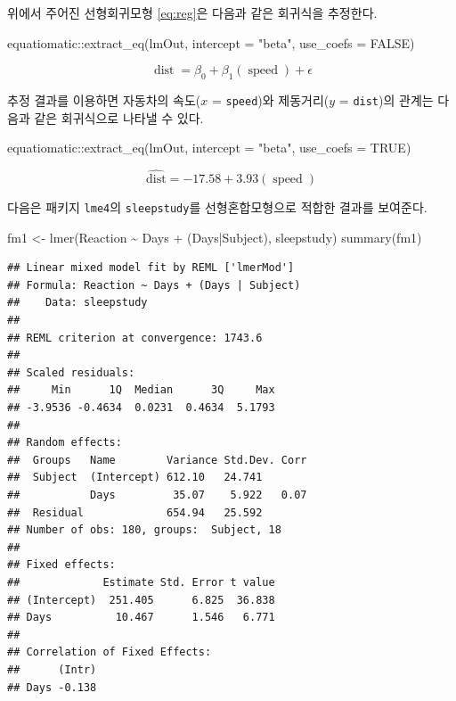 \documentclass[
]{book}
\newenvironment{Shaded}{\begin{snugshade}}{\end{snugshade}}
\newcommand{\AttributeTok}[1]{\textcolor[rgb]{0.77,0.63,0.00}{#1}}
\newcommand{\ConstantTok}[1]{\textcolor[rgb]{0.00,0.00,0.00}{#1}}
\newcommand{\FunctionTok}[1]{\textcolor[rgb]{0.00,0.00,0.00}{#1}}
\newcommand{\NormalTok}[1]{#1}
\newcommand{\OtherTok}[1]{\textcolor[rgb]{0.56,0.35,0.01}{#1}}
\newcommand{\SpecialCharTok}[1]{\textcolor[rgb]{0.00,0.00,0.00}{#1}}
\newcommand{\StringTok}[1]{\textcolor[rgb]{0.31,0.60,0.02}{#1}}
\theoremstyle{definition}
\theoremstyle{definition}
\theoremstyle{definition}
\theoremstyle{definition}
\theoremstyle{remark}
\begin{document}
위에서 주어진 선형회귀모형 \eqref{eq:reg}은 다음과 같은 회귀식을 추정한다.

\begin{Shaded}
\begin{Highlighting}[]
\NormalTok{equatiomatic}\SpecialCharTok{::}\FunctionTok{extract\_eq}\NormalTok{(lmOut, }\AttributeTok{intercept =} \StringTok{"beta"}\NormalTok{,  }\AttributeTok{use\_coefs =} \ConstantTok{FALSE}\NormalTok{)}
\end{Highlighting}
\end{Shaded}

\[
\operatorname{dist} = \beta_{0} + \beta_{1}(\operatorname{speed}) + \epsilon
\]

추정 결과를 이용하면 자동차의 속도(\(x\) = \texttt{speed})와 제동거리(\(y\) = \texttt{dist})의 관계는 다음과 같은 회귀식으로 나타낼 수 있다.

\begin{Shaded}
\begin{Highlighting}[]
\NormalTok{equatiomatic}\SpecialCharTok{::}\FunctionTok{extract\_eq}\NormalTok{(lmOut, }\AttributeTok{intercept =} \StringTok{"beta"}\NormalTok{, }\AttributeTok{use\_coefs =} \ConstantTok{TRUE}\NormalTok{)}
\end{Highlighting}
\end{Shaded}

\[
\operatorname{\widehat{dist}} = -17.58 + 3.93(\operatorname{speed})
\]

다음은 패키지 \texttt{lme4}의 \texttt{sleepstudy}를 선형혼합모형으로 적합한 결과를 보여준다.

\begin{Shaded}
\begin{Highlighting}[]
\NormalTok{fm1 }\OtherTok{\textless{}{-}} \FunctionTok{lmer}\NormalTok{(Reaction }\SpecialCharTok{\textasciitilde{}}\NormalTok{ Days }\SpecialCharTok{+}\NormalTok{ (Days}\SpecialCharTok{|}\NormalTok{Subject), sleepstudy)}
\FunctionTok{summary}\NormalTok{(fm1)}
\end{Highlighting}
\end{Shaded}

\begin{verbatim}
## Linear mixed model fit by REML ['lmerMod']
## Formula: Reaction ~ Days + (Days | Subject)
##    Data: sleepstudy
## 
## REML criterion at convergence: 1743.6
## 
## Scaled residuals: 
##     Min      1Q  Median      3Q     Max 
## -3.9536 -0.4634  0.0231  0.4634  5.1793 
## 
## Random effects:
##  Groups   Name        Variance Std.Dev. Corr
##  Subject  (Intercept) 612.10   24.741       
##           Days         35.07    5.922   0.07
##  Residual             654.94   25.592       
## Number of obs: 180, groups:  Subject, 18
## 
## Fixed effects:
##             Estimate Std. Error t value
## (Intercept)  251.405      6.825  36.838
## Days          10.467      1.546   6.771
## 
## Correlation of Fixed Effects:
##      (Intr)
## Days -0.138
\end{verbatim}
\end{document}
